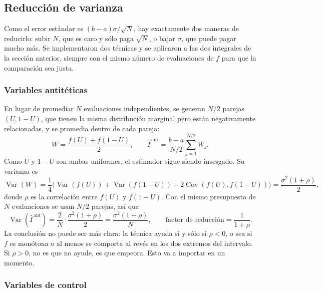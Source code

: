 \documentclass[11pt,letterpaper]{article}
\DeclareMathOperator{\Var}{Var}
\DeclareMathOperator{\Cov}{Cov}
\begin{document}
\subsection{Reducción de varianza}

Como el error estándar es $(b-a)\sigma/\sqrt{N}$, hay exactamente dos maneras
de reducirlo: subir $N$, que es caro y sólo paga $\sqrt{N}$, o bajar
$\sigma$, que puede pagar mucho más. Se implementaron dos técnicas y se
aplicaron a las dos integrales de la sección anterior, siempre con el mismo
número de evaluaciones de $f$ para que la comparación sea justa.

\subsubsection{Variables antitéticas}

En lugar de promediar $N$ evaluaciones independientes, se generan $N/2$
parejas $(U, 1-U)$, que tienen la misma distribución marginal pero están
negativamente relacionadas, y se promedia dentro de cada pareja:
\begin{equation}
W = \frac{f(U) + f(1-U)}{2},
\qquad \hat{I}^{\,\text{ant}} = \frac{b-a}{N/2}\sum_{j=1}^{N/2} W_j.
\end{equation}
Como $U$ y $1-U$ son ambas uniformes, el estimador sigue siendo insesgado.
Su varianza es
\begin{equation}
\Var(W) = \frac{1}{4}\Big(\Var(f(U)) + \Var(f(1-U)) + 2\Cov(f(U), f(1-U))\Big)
= \frac{\sigma^2(1+\rho)}{2},
\end{equation}
donde $\rho$ es la correlación entre $f(U)$ y $f(1-U)$. Con el mismo
presupuesto de $N$ evaluaciones se usan $N/2$ parejas, así que
\begin{equation}
\Var(\hat{I}^{\,\text{ant}}) = \frac{2}{N}\cdot\frac{\sigma^2(1+\rho)}{2}
= \frac{\sigma^2(1+\rho)}{N},
\qquad
\text{factor de reducción} = \frac{1}{1+\rho}.
\label{eq:antiteticas}
\end{equation}
La conclusión no puede ser más clara: la técnica ayuda si y sólo si
$\rho < 0$, o sea si $f$ es monótona o al menos se comporta al revés en los
dos extremos del intervalo. Si $\rho > 0$, no es que no ayude, es que
empeora. Esto va a importar en un momento.

\subsubsection{Variables de control}
\end{document}
